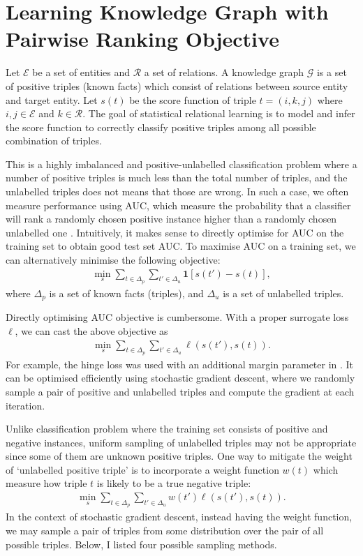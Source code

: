 \documentclass{article}
\theoremstyle{definition}
\begin{document}
\section{Learning Knowledge Graph with Pairwise Ranking Objective}
Let $\mathcal{E}$ be a set of entities and $\mathcal{R}$ a set of relations. A knowledge graph $\mathcal{G}$ is a set of positive triples (known facts) which consist of relations between source entity and target entity. Let $s(t)$ be the score function of triple $t = (i, k, j)$ where $i, j \in \mathcal{E}$ and $k \in \mathcal{R}$. The goal of statistical relational learning is to model and infer the score function to correctly classify positive triples among all possible combination of triples.

This is a highly imbalanced and positive-unlabelled classification problem where a number of positive triples is much less than the total number of triples, and the unlabelled triples does not means that those are wrong.
In such a case, we often measure performance using AUC, which measure the probability that a classifier will rank a randomly chosen positive instance higher than a randomly chosen unlabelled one \cite{menon2011link}. Intuitively, it makes sense to directly optimise for AUC on the training set to obtain good test set AUC.
To maximise AUC on a training set, we can alternatively minimise the following objective:
\begin{align}
\min_s\sum_{t \in \Delta_p}\sum_{t' \in \Delta_u} \mathbf{1}[s(t') - s(t)],
\end{align}
where $\Delta_p$ is a set of known facts (triples), and $\Delta_u$ is a set of unlabelled triples. 

Directly optimising AUC objective is cumbersome. With a proper surrogate loss $\ell$, we can cast the above objective as
\begin{align}
\min_s\sum_{t \in \Delta_p}\sum_{t' \in \Delta_u} \ell(s(t'), s(t)).
\end{align}
For example, the hinge loss was used with an additional margin parameter in \cite{bordes2013translating,Kajino:2015tf}. It can be optimised efficiently using stochastic gradient descent, where we randomly sample a pair of positive and unlabelled triples and compute the gradient at each iteration.

Unlike classification problem where the training set consists of positive and negative instances, uniform sampling of unlabelled triples may not be appropriate since some of them are unknown positive triples. One way to mitigate the weight of `unlabelled positive triple' is to incorporate a weight function $w(t)$ which measure how triple $t$ is likely to be a true negative triple:
\begin{align}
\min_s\sum_{t \in \Delta_p}\sum_{t' \in \Delta_u} w(t') \ell(s(t'), s(t)).
\end{align}
In the context of stochastic gradient descent, instead having the weight function, we may sample a pair of triples from some distribution over the pair of all possible triples. Below, I listed four possible sampling methods.
\end{document}
